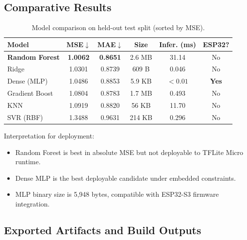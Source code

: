 \subsection{Comparative Results}
\label{sec:tinyml-results}

\begin{table}[H]
\centering
\caption{Model comparison on held-out test split (sorted by MSE).}
\label{tab:comparison}
\renewcommand{\arraystretch}{1.25}
\begin{tabular}{l c c c c c}
    \toprule
    \textbf{Model} & \textbf{MSE}$\downarrow$ &
    \textbf{MAE}$\downarrow$ & \textbf{Size} &
    \textbf{Infer. (ms)} & \textbf{ESP32?} \\
    \midrule
    \textbf{Random Forest}  & \textbf{1.0062} & \textbf{0.8651}
                            & 2.6 MB  & 31.14 & No  \\
    Ridge                   & 1.0301 & 0.8739
                            & 609 B   & 0.046 & No  \\
    Dense (MLP)             & 1.0486 & 0.8853
                            & 5.9 KB  & $<0.01$ & \textbf{Yes} \\
    Gradient Boost          & 1.0804 & 0.8783
                            & 1.7 MB  & 0.493 & No  \\
    KNN                     & 1.0919 & 0.8820
                            & 56 KB   & 11.70 & No  \\
    SVR (RBF)               & 1.3488 & 0.9631
                            & 214 KB  & 0.296 & No  \\
    \bottomrule
\end{tabular}
\end{table}

Interpretation for deployment:
\begin{itemize}
    \item Random Forest is best in absolute MSE but not deployable to
          TFLite Micro runtime.
    \item Dense MLP is the best deployable candidate under embedded
          constraints.
    \item MLP binary size is 5,948 bytes, compatible with ESP32-S3
          firmware integration.
\end{itemize}

\subsection{Exported Artifacts and Build Outputs}
\label{sec:tinyml-artifacts}

